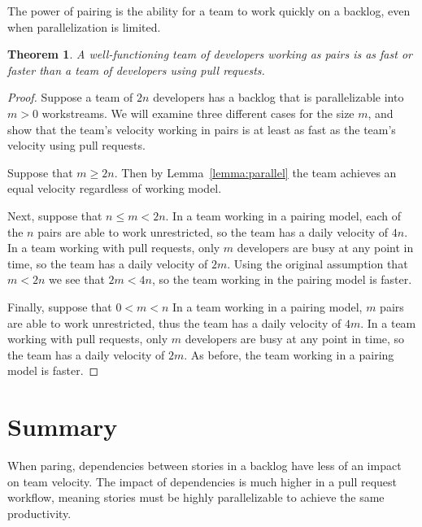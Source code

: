 \documentclass[letterpaper]{article}
\newtheorem{theorem}{Theorem}[section]
\theoremstyle{definition}
\begin{document}
    The power of pairing is the ability for a team to work quickly on a backlog, even when parallelization is limited.

    \begin{theorem}
        A well-functioning team of developers working as pairs is as fast or faster than a team of developers using pull
        requests.
    \end{theorem}
    \begin{proof}
        Suppose a team of $2n$ developers has a backlog that is parallelizable into $m > 0$ workstreams.
        We will examine three different cases for the size $m$, and show that the team's velocity working in pairs is at
        least as fast as the team's velocity using pull requests.

        Suppose that $m\geq 2n$.
        Then by Lemma~\ref{lemma:parallel} the team achieves an equal velocity regardless of working model.

        Next, suppose that $n\leq m < 2n$.
        In a team working in a pairing model, each of the $n$ pairs are able to work unrestricted, so the team has a
        daily velocity of $4n$.
        In a team working with pull requests, only $m$ developers are busy at any point in time, so the team has a daily
        velocity of $2m$.
        Using the original assumption that $m < 2n$ we see that $2m < 4n$, so the team working in the pairing model is
        faster.

        Finally, suppose that $0 < m < n$
        In a team working in a pairing model, $m$ pairs are able to work unrestricted, thus the team has a daily
        velocity of $4m$.
        In a team working with pull requests, only $m$ developers are busy at any point in time, so the team has a daily
        velocity of $2m$.
        As before, the team working in a pairing model is faster.
    \end{proof}


    \section{Summary}\label{sec:summary}

    When paring, dependencies between stories in a backlog have less of an impact on team velocity.
    The impact of dependencies is much higher in a pull request workflow, meaning stories must be highly parallelizable
    to achieve the same productivity.

    
    
\end{document}

